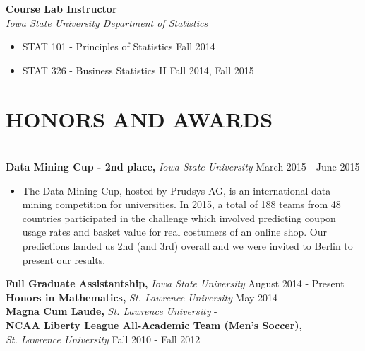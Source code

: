 \documentclass{res} %
\begin{document}
\begin{resume}
{\bf Course Lab Instructor} \\
{\sl Iowa State University Department of Statistics}
\begin{itemize} \itemsep -2pt 
\item STAT 101 - Principles of Statistics \hfill Fall 2014
\item STAT 326 - Business Statistics II \hfill Fall 2014, Fall 2015
\end{itemize}



%


\section{HONORS AND AWARDS}

\hrulefill \\
{\bf Data Mining Cup - 2nd place,} {\sl Iowa State University} \dotfill March 2015 -
June 2015 
\begin{itemize} \itemsep -2pt
  \item The Data Mining Cup, hosted by Prudsys AG, is an international data
    mining competition for universities. In 2015, a total of 188 teams from 48
    countries participated in the challenge which involved predicting coupon
    usage rates and basket value for real costumers of an online shop. Our
    predictions landed us 2nd (and 3rd) overall and we were invited to Berlin to
    present our results.
\end{itemize}
\vspace{-1em}
{\bf Full Graduate Assistantship,} {\sl Iowa State University} \dotfill August 2014 - Present \\
{\bf Honors in Mathematics,} {\sl St. Lawrence University} \dotfill May 2014 \\
{\bf Magna Cum Laude,} {\sl St. Lawrence University} \hfill - \\
{\bf NCAA Liberty League All-Academic Team (Men's Soccer),} \\
{\sl St. Lawrence University} \dotfill Fall 2010 - Fall 2012 


\end{resume}
\end{document}
